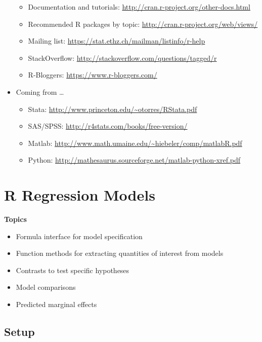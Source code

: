 \documentclass[
]{book}
\providecommand{\tightlist}{%
  \setlength{\itemsep}{0pt}\setlength{\parskip}{0pt}}
\begin{document}
\begin{itemize}
  \begin{itemize}
  \tightlist
  \item
    Documentation and tutorials: \url{http://cran.r-project.org/other-docs.html}
  \item
    Recommended R packages by topic: \url{http://cran.r-project.org/web/views/}
  \item
    Mailing list: \url{https://stat.ethz.ch/mailman/listinfo/r-help}
  \item
    StackOverflow: \url{http://stackoverflow.com/questions/tagged/r}
  \item
    R-Bloggers: \url{https://www.r-bloggers.com/}
  \end{itemize}
\item
  Coming from \ldots{}

  \begin{itemize}
  \tightlist
  \item
    Stata: \url{http://www.princeton.edu/~otorres/RStata.pdf}
  \item
    SAS/SPSS: \url{http://r4stats.com/books/free-version/}
  \item
    Matlab: \url{http://www.math.umaine.edu/~hiebeler/comp/matlabR.pdf}
  \item
    Python: \url{http://mathesaurus.sourceforge.net/matlab-python-xref.pdf}
  \end{itemize}
\end{itemize}

\hypertarget{r-regression-models}{%
\chapter{R Regression Models}\label{r-regression-models}}

\textbf{Topics}

\begin{itemize}
\tightlist
\item
  Formula interface for model specification
\item
  Function methods for extracting quantities of interest from models
\item
  Contrasts to test specific hypotheses
\item
  Model comparisons
\item
  Predicted marginal effects
\end{itemize}

\hypertarget{setup-1}{%
\section{Setup}\label{setup-1}}
\end{document}
